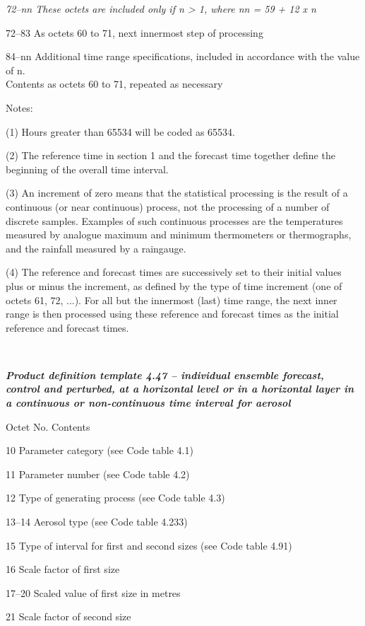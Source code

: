 \emph{72--nn These octets are included only if n \textgreater{} 1, where nn = 59 + 12 x n}

72--83 As octets 60 to 71, next innermost step of processing

84--nn Additional time range specifications, included in accordance with the value of n.\\
Contents as octets 60 to 71, repeated as necessary

Notes:

(1) Hours greater than 65534 will be coded as 65534.

(2) The reference time in section 1 and the forecast time together define the beginning of the overall time interval.

(3) An increment of zero means that the statistical processing is the result of a continuous (or near continuous) process, not the processing of a number of discrete samples. Examples of such continuous processes are the temperatures measured by analogue maximum and minimum thermometers or thermographs, and the rainfall measured by a raingauge.

(4) The reference and forecast times are successively set to their initial values plus or minus the increment, as defined by the type of time increment (one of octets 61, 72, ...). For all but the innermost (last) time range, the next inner range is then processed using these reference and forecast times as the initial reference and forecast times.

\emph{\textbf{\\
}}

\emph{\textbf{Product definition template 4.47 -- individual ensemble forecast, control and perturbed, at a horizontal level or in a horizontal layer in a continuous or non-continuous time interval for aerosol}}

Octet No. Contents

10 Parameter category (see Code table 4.1)

11 Parameter number (see Code table 4.2)

12 Type of generating process (see Code table 4.3)

13--14 Aerosol type (see Code table 4.233)

15 Type of interval for first and second sizes (see Code table 4.91)

16 Scale factor of first size

17--20 Scaled value of first size in metres

21 Scale factor of second size

